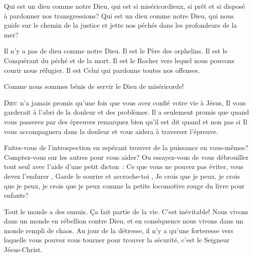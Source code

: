 
Qui est un dieu comme notre Dieu, qui est si miséricordieux,
 si prêt et si disposé à pardonner nos transgressions?
 Qui est un dieu comme notre Dieu, qui nous guide sur le chemin
 de la justice et jette nos péchés dans les profondeurs de la mer? 

Il n'y a pas de dieu comme notre Dieu. Il est le Père des orphelins.
 Il est le Conquérant du péché et de la mort. Il est le Rocher
 vers lequel nous pouvons courir nous réfugier.
 Il est Celui qui pardonne toutes nos offenses. 

Comme nous sommes bénis de servir le Dieu de miséricorde! 

\dvrule






\lettrine{D}{ieu} n'a jamais promis qu'une fois que vous avez confié
 votre vie à Jésus, Il vous garderait à l'abri de la douleur et des problèmes.
 Il a seulement promis que quand vous passerez par des épreuves
 \ocadr remarquez bien qu'il est dit \Og quand \Fg{} et non pas \Og si \Fg{} \fcadr
 Il vous accompagnera dans la douleur et vous aidera à traverser l'épreuve. 


Faites-vous de l'introspection en espérant trouver de la puissance
 en vous-mêmes? Comptez-vous sur les autres pour vous aider?
 Ou essayez-vous de vous débrouiller tout seul avec l'aide d'une petit dicton~:
 \Og Ce que vous ne pouvez pas éviter, vous devez l'endurer \Fg{},
 \Og Garde le sourire et accroche-toi \Fg{},
 \Og Je crois que je peux, je crois que je peux, je crois que je peux \Fg{}
 comme la petite locomotive rouge du livre pour enfants? 

Tout le monde a des ennuis. Ça fait partie de la vie. C'est inévitable!
 Nous vivons dans un monde en rébellion contre Dieu, et en conséquence
 nous vivons dans un monde rempli de chaos. Au jour de la détresse,
 il n'y a qu'une forteresse vers laquelle vous pouvez vous tourner
 pour trouver la sécurité, c'est le Seigneur Jésus-Christ. 

